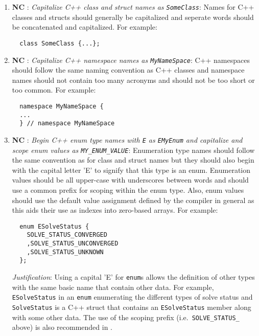 \begin{enumerate}

{}\item{}\textbf{NC }:
{}\textit{Capitalize C++ class and struct names as {}\texttt{SomeClass}}: Names for C++
classes and structs should generally be capitalized and seperate words should
be concatenated and capitalized.  For example:

{\small\begin{verbatim}
  class SomeClass {...};
\end{verbatim}}

{}\item{}\textbf{NC }:
{}\textit{Capitalize C++ namespace names as {}\texttt{MyNameSpace}}: C++
namespaces should follow the same naming convention as C++ classes and
namespace names should not contain too many acronyms and should not be too
short or too common.  For example:

{\small\begin{verbatim}
  namespace MyNameSpace {
  ...
  } // namespace MyNameSpace 
\end{verbatim}}

{}\item{}\textbf{NC }:
{}\textit{Begin C++ enum type names with {}\texttt{E} as {}\texttt{EMyEnum}
and capitalize and scope enum values as {}\texttt{MY\_ENUM\_VALUE}}:
Enumeration type names should follow the same convention as for class and
struct names but they should also begin with the capital letter 'E' to signify
that this type is an enum.  Enumeration values should be all upper-case with
underscores between words and should use a common prefix for scoping within
the enum type.  Also, enum values should use the default value assignment
defined by the compiler in general as this aids their use as indexes into
zero-based arrays.  For example:

{\small\begin{verbatim}
  enum ESolveStatus {
    SOLVE_STATUS_CONVERGED
    ,SOLVE_STATUS_UNCONVERGED
    ,SOLVE_STATUS_UNKNOWN
  };
\end{verbatim}}

{}\textit{Justification}: Using a capital 'E' for {}\texttt{enum}s allows the
definition of other types with the same basic name that contain other data.
For example, {}\texttt{ESolveStatus} in an {}\texttt{enum} enumerating the
different types of solve status and {}\texttt{SolveStatus} is a C++ struct
that contains an {}\texttt{ESolveStatus} member along with some other data.
The use of the scoping prefix (i.e.\ {}\texttt{SOLVE\-\_STATUS\_} above) is
also recommended in {}\cite[Section 11.4]{CodeComplete2nd04}.


\end{enumerate}
